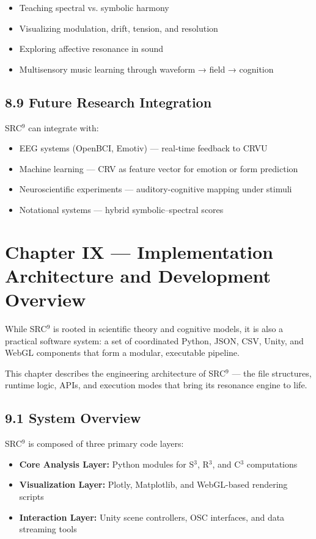 \documentclass[10pt]{article}
\begin{document}
\begin{itemize}
    \item Teaching spectral vs. symbolic harmony
    \item Visualizing modulation, drift, tension, and resolution
    \item Exploring affective resonance in sound
    \item Multisensory music learning through waveform → field → cognition
\end{itemize}

\subsection*{8.9 Future Research Integration}

SRC$^{9}$ can integrate with:

\begin{itemize}
    \item EEG systems (OpenBCI, Emotiv) — real-time feedback to CRVU
    \item Machine learning — CRV as feature vector for emotion or form prediction
    \item Neuroscientific experiments — auditory-cognitive mapping under stimuli
    \item Notational systems — hybrid symbolic–spectral scores
\end{itemize}

\section*{Chapter IX — Implementation Architecture and Development Overview}

While SRC$^{9}$ is rooted in scientific theory and cognitive models, it is also a practical software system: a set of coordinated Python, JSON, CSV, Unity, and WebGL components that form a modular, executable pipeline.

This chapter describes the engineering architecture of SRC$^{9}$ — the file structures, runtime logic, APIs, and execution modes that bring its resonance engine to life.

\subsection*{9.1 System Overview}

SRC$^{9}$ is composed of three primary code layers:

\begin{itemize}
    \item \textbf{Core Analysis Layer:} Python modules for S$^3$, R$^3$, and C$^3$ computations
    \item \textbf{Visualization Layer:} Plotly, Matplotlib, and WebGL-based rendering scripts
    \item \textbf{Interaction Layer:} Unity scene controllers, OSC interfaces, and data streaming tools
\end{itemize}
\end{document}
